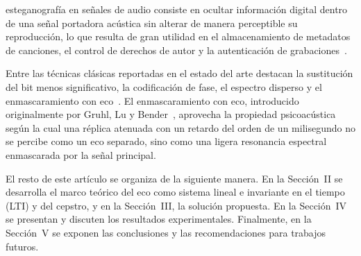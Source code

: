  esteganografía en señales de audio consiste en ocultar información digital dentro de una señal portadora acústica sin alterar de manera perceptible su reproducción, lo que resulta de gran utilidad en el almacenamiento de metadatos de canciones, el control de derechos de autor y la autenticación de grabaciones~\cite{dutta2009,kaur2014}.

Entre las técnicas clásicas reportadas en el estado del arte destacan la sustitución del bit menos significativo, la codificación de fase, el espectro disperso y el enmascaramiento con eco~\cite{dutta2009,kaur2014}. El enmascaramiento con eco, introducido originalmente por Gruhl, Lu y Bender~\cite{gruhl_echo_hiding}, aprovecha la propiedad psicoacústica según la cual una réplica atenuada con un retardo del orden de un milisegundo no se percibe como un eco separado, sino como una ligera resonancia espectral enmascarada por la señal principal.

El resto de este artículo se organiza de la siguiente manera. En la Sección~II se desarrolla el marco teórico del eco como sistema lineal e invariante en el tiempo (LTI) y del cepstro, y en la Sección~III, la solución propuesta. En la Sección~IV se presentan y discuten los resultados experimentales. Finalmente, en la Sección~V se exponen las conclusiones y las recomendaciones para trabajos futuros.
